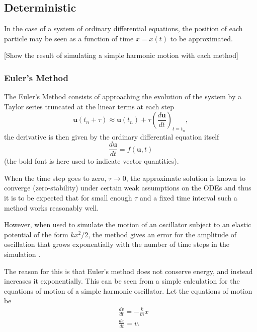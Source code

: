 \subsection{Deterministic}

In the case of a system of ordinary differential equations, the position of each particle may be seen as a function of time $ x=x(t) $ to be approximated.

[Show the result of simulating a simple harmonic motion with each method]

\subsubsection{Euler's Method} 

The Euler's Method consists of approaching the evolution of the system by a Taylor series truncated at the linear terms at each step
$$\mathbf{u}(t_n+\tau) \approx \mathbf{u}(t_n) + \tau\left( \frac{d\mathbf{u}}{dt}\right)_{t=t_n},$$
the derivative is then given by the ordinary differential equation itself
$$\frac{d\mathbf{u}}{dt} = f(\mathbf{u},t)$$
(the bold font is here used to indicate vector quantities).


When the time step goes to zero, $ \tau\to 0 $, the approximate solution is known to converge (zero-stability) under certain weak assumptions on the ODEs \cite{quarteroniNumericalMathematics2007} and thus it is to be expected that for small enough $ \tau $ and a fixed time interval such a method works reasonably well. 

However, when used to simulate the motion of an oscillator subject to an elastic potential of the form $k x^2/2$, the method gives an error for the amplitude of oscillation that grows exponentially with the number of time steps in the simulation \cite{giordanoComputationalPhysics1997}.

The reason for this is that Euler's method does not conserve energy, and instead increases it exponentially. This can be seen from a simple calculation for the equations of motion of a simple harmonic oscillator. Let the equations of motion be
\begin{equation*} \label{eq:2}
\begin{aligned}
&\frac{dv}{dt} = -\frac{k}{m}x\\
&\frac{dx}{dt}=v.
\end{aligned}
\end{equation*}

